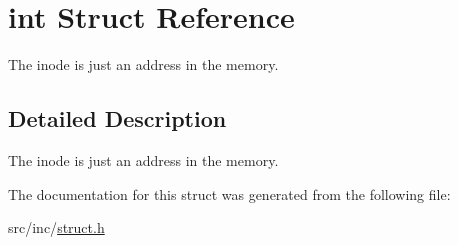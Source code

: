 \hypertarget{structint}{}\section{int Struct Reference}
\label{structint}


The inode is just an address in the memory.  




\subsection{Detailed Description}
The inode is just an address in the memory. 



The documentation for this struct was generated from the following file\+:\begin{DoxyCompactItemize}
\item 
src/inc/\mbox{\hyperlink{struct_8h}{struct.\+h}}\end{DoxyCompactItemize}
